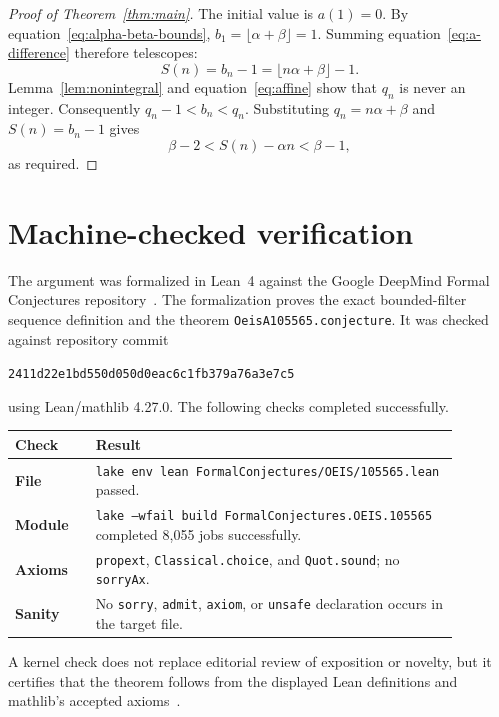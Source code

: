 \documentclass[11pt]{article}
\begin{document}
\begin{proof}[Proof of Theorem~\ref{thm:main}]
The initial value is $a(1)=0$.  By
equation~\eqref{eq:alpha-beta-bounds}, $b_1=\lfloor\alpha+\beta\rfloor=1$.
Summing equation~\eqref{eq:a-difference} therefore telescopes:
\[
 S(n)=b_n-1=\lfloor n\alpha+\beta\rfloor-1.
\]
Lemma~\ref{lem:nonintegral} and equation~\eqref{eq:affine} show that $q_n$ is
never an integer.  Consequently $q_n-1<b_n<q_n$.  Substituting
$q_n=n\alpha+\beta$ and $S(n)=b_n-1$ gives
\[
 \beta-2<S(n)-\alpha n<\beta-1,
\]
as required.
\end{proof}

\section{Machine-checked verification}

The argument was formalized in Lean~4 against the Google DeepMind Formal
Conjectures repository~\cite{formal-repo,formal-paper}.  The formalization
proves the exact bounded-filter sequence definition and the theorem
\texttt{OeisA105565.conjecture}.  It was checked against repository commit
\begin{center}
\small\texttt{2411d22e1bd550d050d0eac6c1fb379a76a3e7c5}
\end{center}
using Lean/mathlib 4.27.0.  The following checks completed successfully.

\begin{center}
\small
\begin{tabular}{>{\bfseries}p{0.16\linewidth}p{0.72\linewidth}}
\toprule
Check & Result \\
\midrule
File & \texttt{lake env lean FormalConjectures/OEIS/105565.lean} passed. \\
Module & \texttt{lake --wfail build FormalConjectures.OEIS.105565} completed
8,055 jobs successfully. \\
Axioms & \texttt{propext}, \texttt{Classical.choice}, and
\texttt{Quot.sound}; no \texttt{sorryAx}. \\
Sanity & No \texttt{sorry}, \texttt{admit}, \texttt{axiom}, or
\texttt{unsafe} declaration occurs in the target file. \\
\bottomrule
\end{tabular}
\end{center}

A kernel check does not replace editorial review of exposition or novelty, but
it certifies that the theorem follows from the displayed Lean definitions and
mathlib's accepted axioms~\cite{lean4,mathlib}.
\end{document}
